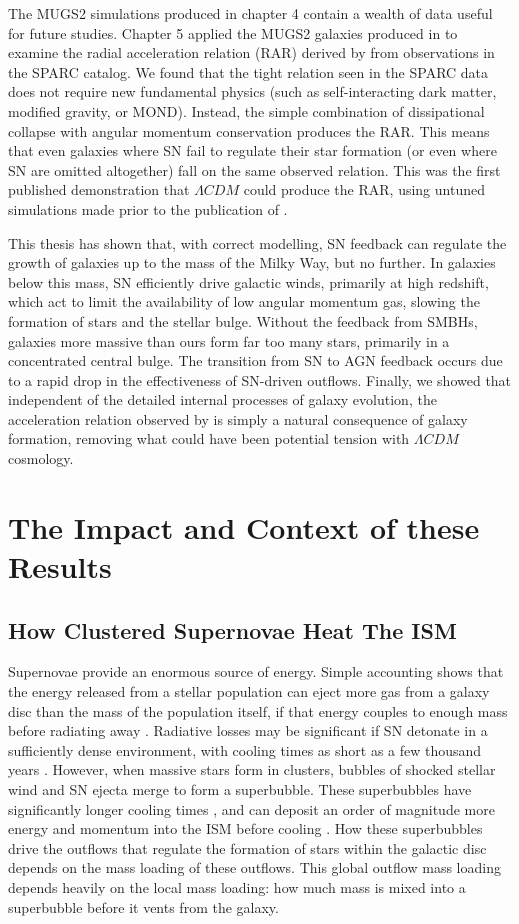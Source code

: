 The MUGS2 simulations produced in chapter 4 contain a wealth of data useful for
future studies. Chapter 5 applied the MUGS2 galaxies produced in
\citet{Keller2016a} to examine the radial acceleration relation (RAR) derived by
\citet{McGaugh2016} from observations in the SPARC \citep{Lelli2016b} catalog.
We found that the tight relation seen in the SPARC data does not require new
fundamental physics (such as self-interacting dark matter, modified gravity, or
MOND).  Instead, the simple combination of dissipational collapse with angular
momentum conservation produces the RAR. This means that even galaxies where SN
fail to regulate their star formation (or even where SN are omitted altogether)
fall on the same observed relation.  This was the first published demonstration
that $\Lambda CDM$ could produce the RAR, using untuned simulations made prior
to the publication of \citet{McGaugh2016}.

This thesis has shown that, with correct modelling, SN feedback can regulate the
growth of galaxies up to the mass of the Milky Way, but no further.  In galaxies
below this mass, SN efficiently drive galactic winds, primarily at high
redshift, which act to limit the availability of low angular momentum gas,
slowing the formation of stars and the stellar bulge. Without the feedback from
SMBHs, galaxies more massive than ours form far too many stars, primarily in a
concentrated central bulge.  The transition from SN to AGN feedback occurs due
to a rapid drop in the effectiveness of SN-driven outflows.  Finally, we showed
that independent of the detailed internal processes of galaxy evolution, the
acceleration relation observed by \citet{McGaugh2016} is simply a natural
consequence of galaxy formation, removing what could have been potential tension
with $\Lambda CDM$ cosmology.

\section{The Impact and Context of these Results}
\subsection{How Clustered Supernovae Heat The ISM}
Supernovae provide an enormous source of energy.  Simple accounting shows that
the energy released from a stellar population can eject more gas from a galaxy
disc than the mass of the population itself, if that energy couples to enough
mass before radiating away \citep{Larson1974}.  Radiative losses may be
significant if SN detonate in a sufficiently dense environment,
with cooling times as short as a few thousand years \citep{Chevalier1974}.
However, when massive stars form in clusters, bubbles of shocked stellar wind
and SN ejecta merge to form a superbubble.  These superbubbles have
significantly longer cooling times \citep{MacLow1988}, and can deposit an order
of magnitude more energy and momentum into the ISM before cooling
\citep{Gentry2017}.  How these superbubbles drive the 
outflows that regulate the formation of stars within the galactic disc depends
on the mass loading of these outflows.  This global outflow mass loading
depends heavily on the local mass loading: how much mass is mixed into a
superbubble before it vents from the galaxy.

